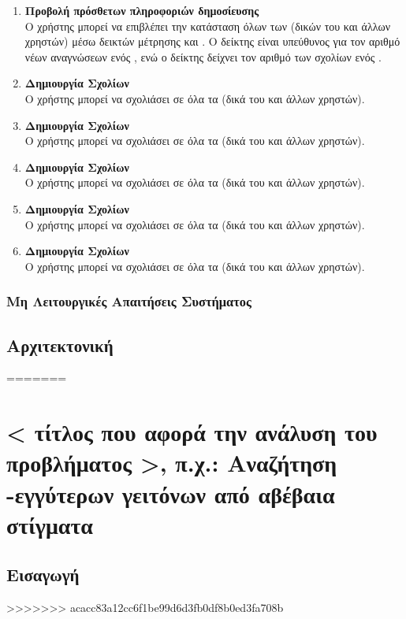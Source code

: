 \begin{enumerate}
    \item \textbf{Προβολή πρόσθετων πληροφοριών δημοσίευσης} \\
    Ο χρήστης μπορεί να επιβλέπει την κατάσταση όλων των  (δικών του και άλλων χρηστών) μέσω δεικτών μέτρησης  και . Ο δείκτης  είναι υπεύθυνος για τον αριθμό νέων αναγνώσεων ενός , ενώ ο δείκτης  δείχνει τον αριθμό των σχολίων ενός . 
    \item \textbf{Δημιουργία Σχολίων} \\
    Ο χρήστης μπορεί να σχολιάσει σε όλα τα  (δικά του και άλλων χρηστών).
    \item \textbf{Δημιουργία Σχολίων} \\
    Ο χρήστης μπορεί να σχολιάσει σε όλα τα  (δικά του και άλλων χρηστών).
    \item \textbf{Δημιουργία Σχολίων} \\
    Ο χρήστης μπορεί να σχολιάσει σε όλα τα  (δικά του και άλλων χρηστών).
    \item \textbf{Δημιουργία Σχολίων} \\
    Ο χρήστης μπορεί να σχολιάσει σε όλα τα  (δικά του και άλλων χρηστών).
    \item \textbf{Δημιουργία Σχολίων} \\
    Ο χρήστης μπορεί να σχολιάσει σε όλα τα  (δικά του και άλλων χρηστών).
\end{enumerate}



\subsection{Μη Λειτουργικές Απαιτήσεις Συστήματος}

\section{Αρχιτεκτονική}
=======
\chapter{< τίτλος που αφορά την ανάλυση του προβλήματος >, π.χ.: Αναζήτηση -εγγύτερων γειτόνων από αβέβαια στίγματα}
\label{chap4}

\section{Εισαγωγή}
>>>>>>> acacc83a12cc6f1be99d6d3fb0df8b0ed3fa708b

